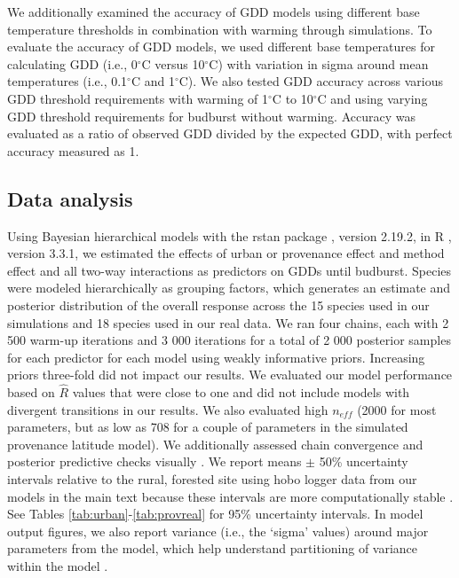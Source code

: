 \documentclass{article}\usepackage[]{graphicx}\usepackage[]{color}
\begin{document}
We additionally examined the accuracy of GDD models using different base temperature thresholds in combination with warming through simulations. To evaluate the accuracy of GDD models, we used different base temperatures for calculating GDD (i.e., 0$^{\circ}$C versus 10$^{\circ}$C) with variation in sigma around mean temperatures (i.e., 0.1$^{\circ}$C and 1$^{\circ}$C). We also tested GDD accuracy across various GDD threshold requirements with warming of 1$^{\circ}$C to 10$^{\circ}$C and using varying GDD threshold requirements for budburst without warming. Accuracy was evaluated as a ratio of observed GDD divided by the expected GDD, with perfect accuracy measured as 1.

\subsection*{Data analysis}
Using Bayesian hierarchical models with the rstan package \citep{rstan2019}, version 2.19.2,  in R \citep{R}, version 3.3.1, we estimated the effects of urban or provenance effect and method effect and all two-way interactions as predictors on GDDs until budburst. Species were modeled hierarchically as grouping factors, which generates an estimate and posterior distribution of the overall response across the 15 species used in our simulations and 18 species used in our real data. We ran four chains, each with 2 500 warm-up iterations and 3 000 iterations for a total of 2 000 posterior samples for each predictor for each model using weakly informative priors. Increasing priors three-fold did not impact our results. We evaluated our model performance based on $\hat{R}$ values that were close to one and did not include models with divergent transitions in our results. We also evaluated high $n_{eff}$ (2000 for most parameters, but as low as 708 for a couple of parameters in the simulated provenance latitude model). We additionally assessed chain convergence and posterior predictive checks visually \citep{BDA}. We report means $\pm$ 50\% uncertainty intervals relative to the rural, forested site using hobo logger data from our models in the main text because these intervals are more computationally stable \citep{Carpenter2017,BDA}. See Tables \ref{tab:urban}-\ref{tab:provreal} for 95\% uncertainty intervals. In model output figures, we also report variance (i.e., the `sigma' values) around major parameters from the model, which help understand partitioning of variance within the model \citep{BDA}. 
\end{document}
